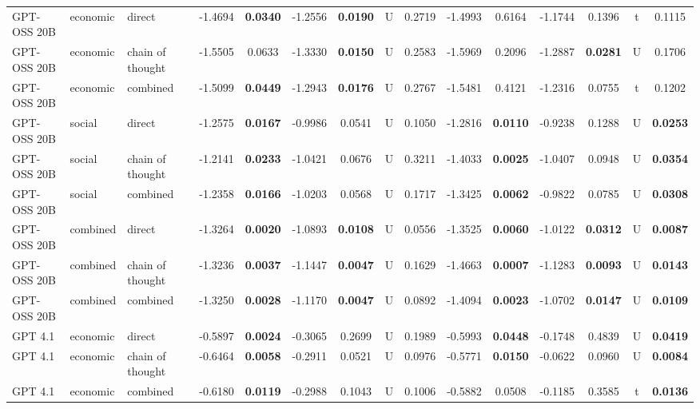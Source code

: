 \begin{center}
\begin{longtable}{@{}lll|cccccc|cccccc@{}}
        GPT-OSS 20B & economic & direct & -1.4694 & \textbf{0.0340} & -1.2556 & \textbf{0.0190} & U & 0.2719 & -1.4993 & 0.6164 & -1.1744 & 0.1396 & t & 0.1115 \\
        GPT-OSS 20B & economic & chain of thought & -1.5505 & 0.0633 & -1.3330 & \textbf{0.0150} & U & 0.2583 & -1.5969 & 0.2096 & -1.2887 & \textbf{0.0281} & U & 0.1706 \\
        GPT-OSS 20B & economic & combined & -1.5099 & \textbf{0.0449} & -1.2943 & \textbf{0.0176} & U & 0.2767 & -1.5481 & 0.4121 & -1.2316 & 0.0755 & t & 0.1202 \\
        GPT-OSS 20B & social & direct & -1.2575 & \textbf{0.0167} & -0.9986 & 0.0541 & U & 0.1050 & -1.2816 & \textbf{0.0110} & -0.9238 & 0.1288 & U & \textbf{0.0253} \\
        GPT-OSS 20B & social & chain of thought & -1.2141 & \textbf{0.0233} & -1.0421 & 0.0676 & U & 0.3211 & -1.4033 & \textbf{0.0025} & -1.0407 & 0.0948 & U & \textbf{0.0354} \\
        GPT-OSS 20B & social & combined & -1.2358 & \textbf{0.0166} & -1.0203 & 0.0568 & U & 0.1717 & -1.3425 & \textbf{0.0062} & -0.9822 & 0.0785 & U & \textbf{0.0308} \\
        GPT-OSS 20B & combined & direct & -1.3264 & \textbf{0.0020} & -1.0893 & \textbf{0.0108} & U & 0.0556 & -1.3525 & \textbf{0.0060} & -1.0122 & \textbf{0.0312} & U & \textbf{0.0087} \\
        GPT-OSS 20B & combined & chain of thought & -1.3236 & \textbf{0.0037} & -1.1447 & \textbf{0.0047} & U & 0.1629 & -1.4663 & \textbf{0.0007} & -1.1283 & \textbf{0.0093} & U & \textbf{0.0143} \\
        \rowcolor{gray!20} GPT-OSS 20B & combined & combined & -1.3250 & \textbf{0.0028} & -1.1170 & \textbf{0.0047} & U & 0.0892 & -1.4094 & \textbf{0.0023} & -1.0702 & \textbf{0.0147} & U & \textbf{0.0109} \\
        GPT 4.1 & economic & direct & -0.5897 & \textbf{0.0024} & -0.3065 & 0.2699 & U & 0.1989 & -0.5993 & \textbf{0.0448} & -0.1748 & 0.4839 & U & \textbf{0.0419} \\
        GPT 4.1 & economic & chain of thought & -0.6464 & \textbf{0.0058} & -0.2911 & 0.0521 & U & 0.0976 & -0.5771 & \textbf{0.0150} & -0.0622 & 0.0960 & U & \textbf{0.0084} \\
        GPT 4.1 & economic & combined & -0.6180 & \textbf{0.0119} & -0.2988 & 0.1043 & U & 0.1006 & -0.5882 & 0.0508 & -0.1185 & 0.3585 & t & \textbf{0.0136} \\

\end{longtable}
\end{center}
